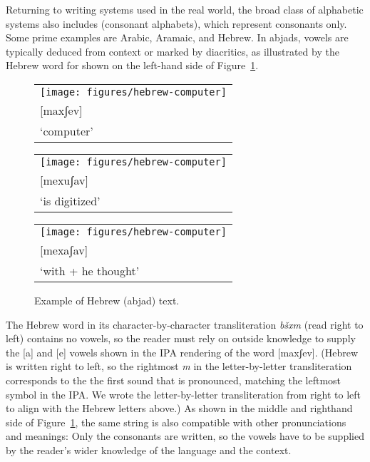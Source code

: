 Returning to writing systems used in the real world, the broad class of alphabetic systems also includes  (consonant alphabets), which represent 
consonants only.  Some prime examples are Arabic, Aramaic, and Hebrew.
In abjads, vowels are typically deduced from context or marked by diacritics,  
as illustrated by the Hebrew word for  shown on the
left-hand side of Figure~\ref{fig:hebrew}.

\begin{figure}[htb!]
\mbox{}
\hfill\hfill  \begin{tabular}{l}
      \texttt{[image: figures/hebrew-computer]}\\
      {[maxʃev]}\\[2pt]
      `computer'\\
    \end{tabular}
\hfill
\begin{tabular}{l}
      \texttt{[image: figures/hebrew-computer]}\\
      {[mexuʃav]}\\[2pt]
      `is digitized'\\
    \end{tabular}
\hfill
\begin{tabular}{l}
      \texttt{[image: figures/hebrew-computer]}\\
      {[mexaʃav]}\\[2pt]
      `with + he thought'\\
    \end{tabular}
\hfill
\hfill
\mbox{}
\caption{Example of Hebrew (abjad) text.}
\label{fig:hebrew}
\end{figure}

The Hebrew word in its character-by-character transliteration
\textit{b\v{s}xm} (read right to left) contains no vowels, so the reader must rely on outside knowledge to supply the
{[a]} and {[e]} vowels shown in the IPA rendering of
the word {[maxʃev]}.  (Hebrew is written
right to left, so the rightmost \textit{m} in the letter-by-letter transliteration corresponds to the 
the first sound that is pronounced, matching the leftmost symbol in the  IPA.  We wrote the letter-by-letter transliteration from right to left to align with the Hebrew letters above.)  As shown in the middle
and righthand side of Figure~\ref{fig:hebrew}, the same string is also compatible with 
 other pronunciations and meanings: Only the consonants are written, so the vowels have to be supplied by the reader's wider knowledge of the language and the context.
	



